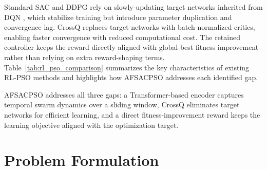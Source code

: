 \documentclass[final,5p,times]{elsarticle}
\begin{document}
Standard SAC and DDPG rely on slowly-updating target networks inherited from DQN \cite{Mnih2015Humanlevel}, which stabilize training but introduce parameter duplication and convergence lag.
CrossQ \cite{Bhatt2024CrossQ} replaces target networks with batch-normalized critics, enabling faster convergence with reduced computational cost.
The retained controller keeps the reward directly aligned with global-best fitness improvement rather than relying on extra reward-shaping terms. Table~\ref{tab:rl_pso_comparison} summarizes the key characteristics of existing RL-PSO methods and highlights how AFSACPSO addresses each identified gap. \begin{table}[htbp]
\centering
\small
\caption{Comparison of RL-based PSO parameter adaptation methods. AFSACPSO uniquely combines temporal encoding, target-free learning, and a direct fitness-improvement reward.}
\label{tab:rl_pso_comparison}
\end{table} AFSACPSO addresses all three gaps: a Transformer-based encoder captures temporal swarm dynamics over a sliding window, CrossQ eliminates target networks for efficient learning, and a direct fitness-improvement reward keeps the learning objective aligned with the optimization target. \section{Problem Formulation}
\end{document}
